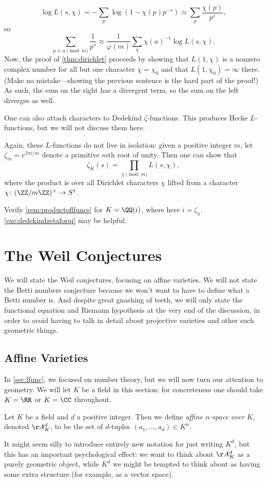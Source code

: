\documentclass{article}
\begin{document}
\[\log L(s,\chi)=-\sum_p\log\left(1-\chi(p)p^{-s}\right)\approx\sum_p\frac{\chi(p)}{p^s},\]
so
\[\sum_{p\equiv a\pmod m}\frac1{p^s}\approx\frac1{\varphi(m)}\sum_\chi\chi(a)^{-1}\log L(s,\chi).\]
Now, the proof of \autoref{thm:dirichlet} proceeds by showing that $L(1,\chi)$ is a nonzero complex number for all but one character $\chi=\chi_0$ and that $L(1,\chi_0)=\infty$ there. (Make no mistake---showing the previous sentence is the hard part of the proof!) As such, the sum on the right has a divergent term, so the sum on the left diverges as well.
\begin{remark}
	One can also attach characters to Dedekind $\zeta$-functions. This produces Hecke $L$-functions, but we will not discuss them here.
\end{remark}
\begin{remark} \label{rem:productoflfuncs}
	Again, these $L$-functions do not live in isolation: given a positive integer $m$, let $\zeta_m=e^{2\pi i/m}$ denote a primitive $m$th root of unity. Then one can show that
	\[\zeta_K(s)=\prod_{\chi\pmod m}L(s,\chi),\]
	where the product is over all Dirichlet characters $\chi$ lifted from a character $\chi\colon(\ZZ/m\ZZ)^\times\to S^1$.
\end{remark}
\begin{exe}
	Verify \autoref{rem:productoflfuncs} for $K=\QQ(i)$, where here $i=\zeta_4$. \autoref{exe:dedekindzetaforqi} may be helpful.
\end{exe}

\section{The Weil Conjectures}
We will state the Weil conjectures, focusing on affine varieties. We will not state the Betti numbers conjecture because we won't want to have to define what a Betti number is. And despite great gnashing of teeth, we will only state the functional equation and Riemann hypothesis at the very end of the discussion, in order to avoid having to talk in detail about projective varieties and other such geometric things.

\subsection{Affine Varieties}
In \autoref{sec:lfunc}, we focused on number theory, but we will now turn our attention to geometry. We will let $K$ be a field in this section; for concreteness one should take $K=\RR$ or $K=\CC$ throughout.
\begin{definition}
	Let $K$ be a field and $d$ a positive integer. Then we define \textit{affine $n$-space over $K$}, denoted $\AA_K^d$, to be the set of $d$-tuples $(a_1,\ldots,a_d)\in K^n$.
\end{definition}
It might seem silly to introduce entirely new notation for just writing $K^d$, but this has an important psychological effect: we want to think about $\AA_K^d$ as a purely geometric object, while $K^d$ we might be tempted to think about as having some extra structure (for example, as a vector space).
\end{document}
